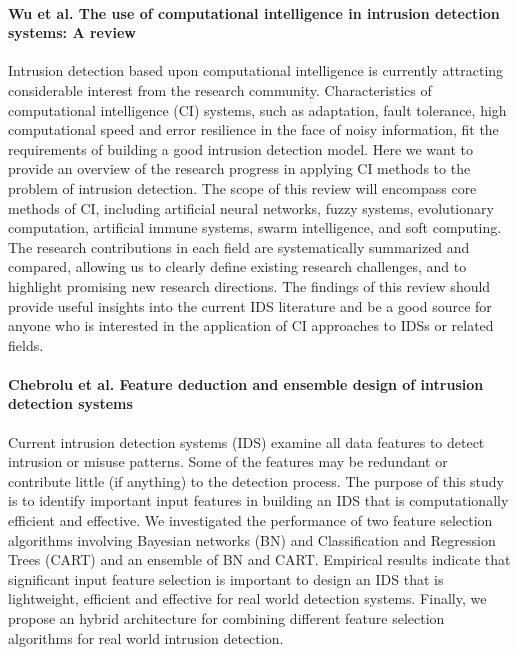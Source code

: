 \paragraph*{Wu et al. The use of computational intelligence in intrusion detection systems: A review}
\cite{wu2010use}
Intrusion detection based upon computational intelligence is currently attracting considerable interest from the research community. Characteristics of computational intelligence (CI) systems, such as adaptation, fault tolerance, high computational speed and error resilience in the face of noisy information, fit the requirements of building a good intrusion detection model. Here we want to provide an overview of the research progress in applying CI methods to the problem of intrusion detection. The scope of this review will encompass core methods of CI, including artificial neural networks, fuzzy systems, evolutionary computation, artificial immune systems, swarm intelligence, and soft computing. The research contributions in each field are systematically summarized and compared, allowing us to clearly define existing research challenges, and to highlight promising new research directions. The findings of this review should provide useful insights into the current IDS literature and be a good source for anyone who is interested in the application of CI approaches to IDSs or related fields.

\paragraph*{Chebrolu et al. Feature deduction and ensemble design of intrusion detection systems}
\cite{chebrolu2005feature}
Current intrusion detection systems (IDS) examine all data features to detect intrusion or misuse patterns. Some of the features may be redundant or contribute little (if anything) to the detection process. The purpose of this study is to identify important input features in building an IDS that is computationally efficient and effective. We investigated the performance of two feature selection algorithms involving Bayesian networks (BN) and Classification and Regression Trees (CART) and an ensemble of BN and CART. Empirical results indicate that significant input feature selection is important to design an IDS that is lightweight, efficient and effective for real world detection systems. Finally, we propose an hybrid architecture for combining different feature selection algorithms for real world intrusion detection.

